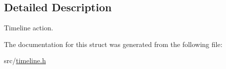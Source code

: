 \subsection{\-Detailed \-Description}
\-Timeline action. 

\-The documentation for this struct was generated from the following file\-:\begin{DoxyCompactItemize}
\item 
src/\hyperlink{timeline_8h}{timeline.\-h}\end{DoxyCompactItemize}
